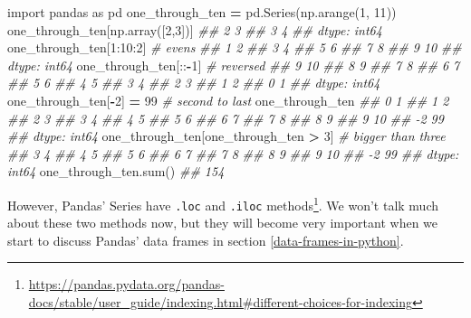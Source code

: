 \documentclass[
  12pt,
  krantz2]{krantz}
\makeatletter
\newenvironment{Shaded}{\begin{snugshade}}{\end{snugshade}}
\newcommand{\BuiltInTok}[1]{#1}
\newcommand{\CommentTok}[1]{\textcolor[rgb]{0.37,0.37,0.37}{\textit{#1}}}
\newcommand{\DecValTok}[1]{\textcolor[rgb]{0.06,0.06,0.06}{#1}}
\newcommand{\ImportTok}[1]{#1}
\newcommand{\NormalTok}[1]{#1}
\newcommand{\OperatorTok}[1]{\textcolor[rgb]{0.43,0.43,0.43}{\textbf{#1}}}
\renewcommand{\href}[2]{#2\footnote{\url{#1}}}
\newenvironment{kframe}{%
\medskip{}
\setlength{\fboxsep}{.8em}
 \def\at@end@of@kframe{}%
 \ifinner\ifhmode%
  \def\at@end@of@kframe{\end{minipage}}%
  \begin{minipage}{\columnwidth}%
 \fi\fi%
 \def\FrameCommand##1{\hskip\@totalleftmargin \hskip-\fboxsep
 \colorbox{shadecolor}{##1}\hskip-\fboxsep
     \hskip-\linewidth \hskip-\@totalleftmargin \hskip\columnwidth}%
 \MakeFramed {\advance\hsize-\width
   \@totalleftmargin\z@ \linewidth\hsize
   \@setminipage}}%
 {\par\unskip\endMakeFramed%
 \at@end@of@kframe}
\renewenvironment{Shaded}{\begin{kframe}}{\end{kframe}}
\makeatother
\begin{document}
\begin{Shaded}
\begin{Highlighting}[]
\ImportTok{import}\NormalTok{ pandas }\ImportTok{as}\NormalTok{ pd}
\NormalTok{one\_through\_ten }\OperatorTok{=}\NormalTok{ pd.Series(np.arange(}\DecValTok{1}\NormalTok{, }\DecValTok{11}\NormalTok{))}
\NormalTok{one\_through\_ten[np.array([}\DecValTok{2}\NormalTok{,}\DecValTok{3}\NormalTok{])]}
\CommentTok{\#\# 2    3}
\CommentTok{\#\# 3    4}
\CommentTok{\#\# dtype: int64}
\NormalTok{one\_through\_ten[}\DecValTok{1}\NormalTok{:}\DecValTok{10}\NormalTok{:}\DecValTok{2}\NormalTok{] }\CommentTok{\# evens}
\CommentTok{\#\# 1     2}
\CommentTok{\#\# 3     4}
\CommentTok{\#\# 5     6}
\CommentTok{\#\# 7     8}
\CommentTok{\#\# 9    10}
\CommentTok{\#\# dtype: int64}
\NormalTok{one\_through\_ten[::}\OperatorTok{{-}}\DecValTok{1}\NormalTok{] }\CommentTok{\# reversed}
\CommentTok{\#\# 9    10}
\CommentTok{\#\# 8     9}
\CommentTok{\#\# 7     8}
\CommentTok{\#\# 6     7}
\CommentTok{\#\# 5     6}
\CommentTok{\#\# 4     5}
\CommentTok{\#\# 3     4}
\CommentTok{\#\# 2     3}
\CommentTok{\#\# 1     2}
\CommentTok{\#\# 0     1}
\CommentTok{\#\# dtype: int64}
\NormalTok{one\_through\_ten[}\OperatorTok{{-}}\DecValTok{2}\NormalTok{] }\OperatorTok{=} \DecValTok{99} \CommentTok{\# second to last}
\NormalTok{one\_through\_ten}
\CommentTok{\#\#  0     1}
\CommentTok{\#\#  1     2}
\CommentTok{\#\#  2     3}
\CommentTok{\#\#  3     4}
\CommentTok{\#\#  4     5}
\CommentTok{\#\#  5     6}
\CommentTok{\#\#  6     7}
\CommentTok{\#\#  7     8}
\CommentTok{\#\#  8     9}
\CommentTok{\#\#  9    10}
\CommentTok{\#\# {-}2    99}
\CommentTok{\#\# dtype: int64}
\NormalTok{one\_through\_ten[one\_through\_ten }\OperatorTok{\textgreater{}} \DecValTok{3}\NormalTok{] }\CommentTok{\# bigger than three}
\CommentTok{\#\#  3     4}
\CommentTok{\#\#  4     5}
\CommentTok{\#\#  5     6}
\CommentTok{\#\#  6     7}
\CommentTok{\#\#  7     8}
\CommentTok{\#\#  8     9}
\CommentTok{\#\#  9    10}
\CommentTok{\#\# {-}2    99}
\CommentTok{\#\# dtype: int64}
\NormalTok{one\_through\_ten.}\BuiltInTok{sum}\NormalTok{()}
\CommentTok{\#\# 154}
\end{Highlighting}
\end{Shaded}

However, \href{https://pandas.pydata.org/pandas-docs/stable/user_guide/indexing.html\#different-choices-for-indexing}{Pandas' Series have \texttt{.loc} and \texttt{.iloc} methods}. We won't talk much about these two methods now, but they will become very important when we start to discuss Pandas' data frames in section \ref{data-frames-in-python}.
\end{document}
